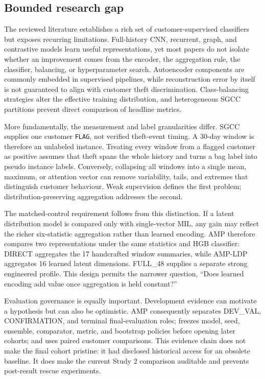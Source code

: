 \subsection{Bounded research gap}

The reviewed literature establishes a rich set of customer-supervised classifiers but exposes recurring limitations. Full-history CNN, recurrent, graph, and contrastive models learn useful representations, yet most papers do not isolate whether an improvement comes from the encoder, the aggregation rule, the classifier, balancing, or hyperparameter search. Autoencoder components are commonly embedded in supervised pipelines, while reconstruction error by itself is not guaranteed to align with customer theft discrimination. Class-balancing strategies alter the effective training distribution, and heterogeneous SGCC partitions prevent direct comparison of headline metrics.

More fundamentally, the measurement and label granularities differ. SGCC supplies one customer \texttt{FLAG}, not verified theft-event timing. A 30-day window is therefore an unlabeled instance. Treating every window from a flagged customer as positive assumes that theft spans the whole history and turns a bag label into pseudo instance labels. Conversely, collapsing all windows into a single mean, maximum, or attention vector can remove variability, tails, and extremes that distinguish customer behaviour. Weak supervision defines the first problem; distribution-preserving aggregation addresses the second.

The matched-control requirement follows from this distinction. If a latent distribution model is compared only with single-vector MIL, any gain may reflect the richer six-statistic aggregation rather than learned encoding. AMP therefore compares two representations under the same statistics and HGB classifier: DIRECT aggregates the 17 handcrafted window summaries, while AMP-LDP aggregates 16 learned latent dimensions. FULL\_48 supplies a separate strong engineered profile. This design permits the narrower question, ``Does learned encoding add value once aggregation is held constant?''

Evaluation governance is equally important. Development evidence can motivate a hypothesis but can also be optimistic. AMP consequently separates DEV\_VAL, CONFIRMATION, and terminal final-evaluation roles; freezes model, seed, ensemble, comparator, metric, and bootstrap policies before opening later cohorts; and uses paired customer comparisons. This evidence chain does not make the final cohort pristine: it had disclosed historical access for an obsolete baseline. It does make the current Study 2 comparison auditable and prevents post-result rescue experiments.

